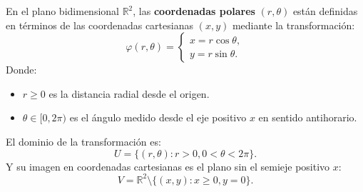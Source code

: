 \begin{definición}
    En el plano bidimensional $\mathbb{R}^2$, las \textbf{coordenadas polares} $(r, \theta)$ están definidas en términos de las coordenadas cartesianas $(x, y)$ mediante la transformación:  
    $$ 
    \varphi(r, \theta) =
    \begin{cases} 
        x = r\cos\theta, \\ 
        y = r\sin\theta.
    \end{cases}
    $$  
    Donde:  
    \begin{itemize}
        \item $r \geq 0$ es la distancia radial desde el origen.
        \item $\theta \in [0, 2\pi)$ es el ángulo medido desde el eje positivo $x$ en sentido antihorario.
    \end{itemize}

    El dominio de la transformación es:  
    $$
    U = \{(r, \theta) : r > 0, 0 < \theta < 2\pi\}.
    $$  
    Y su imagen en coordenadas cartesianas es el plano sin el semieje positivo $x$:  
    $$
    V = \mathbb{R}^2 \setminus \{ (x,y) : x \geq 0, y = 0\}.
    $$  


\end{definición}
